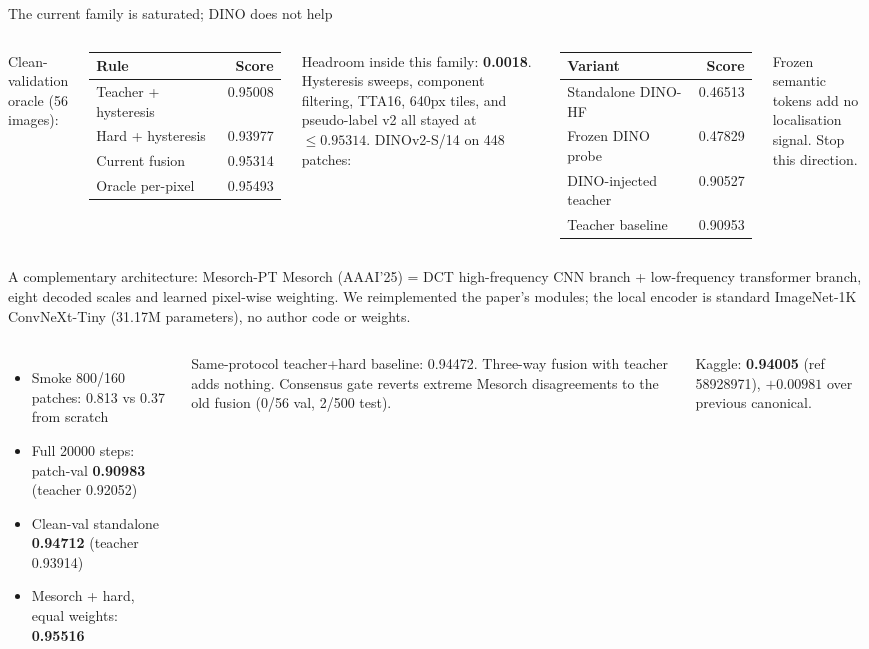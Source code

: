 \documentclass[10pt]{beamer}
\begin{document}
\begin{frame}{The current family is saturated; DINO does not help}
\begin{columns}[T]
\small
Clean-validation oracle (56 images):
\begin{tabular}{lr}
\toprule Rule & Score \\
\midrule
Teacher + hysteresis & 0.95008 \\
Hard + hysteresis & 0.93977 \\
Current fusion & 0.95314 \\
Oracle per-pixel & 0.95493 \\
\bottomrule
\end{tabular}
\vspace{.1cm}
Headroom inside this family: \textbf{0.0018}. Hysteresis sweeps, component filtering, TTA16, 640px tiles, and pseudo-label v2 all stayed at $\le 0.95314$.
\small
DINOv2-S/14 on 448 patches:
\begin{tabular}{lr}
\toprule Variant & Score \\
\midrule
Standalone DINO-HF & 0.46513 \\
Frozen DINO probe & 0.47829 \\
DINO-injected teacher & 0.90527 \\
Teacher baseline & 0.90953 \\
\bottomrule
\end{tabular}
\vspace{.1cm}
Frozen semantic tokens add no localisation signal. Stop this direction.
\end{columns}
\end{frame}

\begin{frame}{A complementary architecture: Mesorch-PT}
\small
Mesorch (AAAI'25) = DCT high-frequency CNN branch + low-frequency transformer branch, eight decoded scales and learned pixel-wise weighting. We reimplemented the paper's modules; the local encoder is standard ImageNet-1K ConvNeXt-Tiny (31.17M parameters), no author code or weights.
\vspace{.15cm}
\begin{columns}[T]
\footnotesize
\begin{itemize}
\item Smoke 800/160 patches: 0.813 vs 0.37 from scratch
\item Full 20000 steps: patch-val \textbf{0.90983} (teacher 0.92052)
\item Clean-val standalone \textbf{0.94712} (teacher 0.93914)
\item Mesorch + hard, equal weights: \textbf{0.95516}
\end{itemize}
\footnotesize
Same-protocol teacher+hard baseline: 0.94472. Three-way fusion with teacher adds nothing. Consensus gate reverts extreme Mesorch disagreements to the old fusion (0/56 val, 2/500 test).
\vspace{.1cm}

Kaggle: \textbf{0.94005} (ref 58928971), $+0.00981$ over previous canonical.
\end{columns}
\end{frame}
\end{document}
